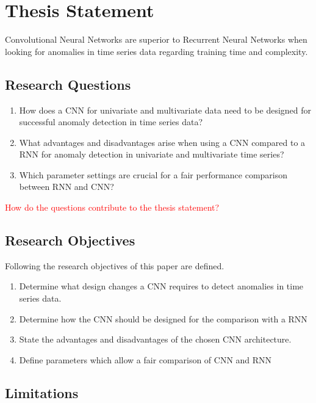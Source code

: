 \section{Thesis Statement} \label{thesisstatement}

Convolutional Neural Networks are superior to Recurrent Neural Networks when looking for anomalies in time series data regarding training time and complexity.

\subsection{Research Questions} \label{research_questions}

\begin{enumerate}
	\item How does a CNN for univariate and multivariate data need to be designed for successful anomaly detection in time series data?
	\item What advantages and disadvantages arise when using a CNN compared to a RNN for anomaly detection in univariate and multivariate time series?
	\item Which parameter settings are crucial for a fair performance comparison between RNN and CNN? 
\end{enumerate}

\textcolor{red}{How do the questions contribute to the thesis statement?}

 
\subsection{Research Objectives}

Following the research objectives of this paper are defined.


\begin{enumerate}
	\item Determine what design changes a CNN requires to detect anomalies in time series data.
	\item Determine how the CNN should be designed for the comparison with a RNN
	\item State the advantages and disadvantages of the chosen CNN architecture.
	\item Define parameters which allow a fair comparison of CNN and RNN
\end{enumerate}

\subsection{Limitations}

